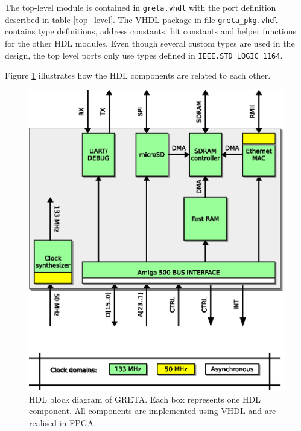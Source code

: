 \documentclass[a4paper]{report}
\begin{document}
The top-level module is contained in \texttt{greta.vhdl}
with the port definition described in table \ref{top_level}.
The VHDL package in file \texttt{greta\_pkg.vhdl} contains
type definitions, address constants, bit constants and helper
functions for the other HDL modules. Even though several custom
types are used in the design, the top level ports only use
types defined in \texttt{IEEE.STD\_LOGIC\_1164}.

Figure \ref{hdl_overview} illustrates how the HDL
components are related to each other.

\begin{figure}
\centering
\includegraphics{hdl_overview.eps}
\caption{HDL block diagram of GRETA. Each box represents one
HDL component. All components are implemented using VHDL and
are realised in FPGA.}
\label{hdl_overview}
\end{figure}
\end{document}
